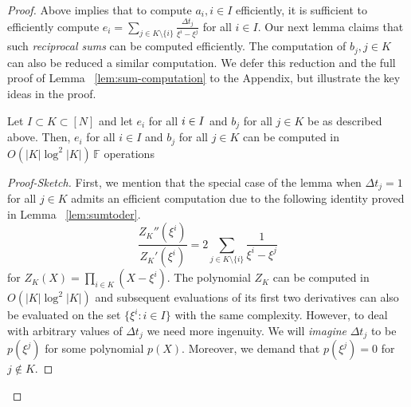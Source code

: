 \begin{proof}
    Above implies that to compute $a_i, i\in I$ efficiently, it is sufficient to efficiently
    compute $e_i=\sum_{j\in K\setminus\{i\}}\frac{\Delta t_j}{\xi^i-\xi^j}$ for all $i \in I$. Our next lemma claims that
    such {\em reciprocal sums} can be computed efficiently. The computation of $b_j,j\in K$ can also be reduced a similar computation.
    We defer this reduction and the full proof of Lemma ~\ref{lem:sum-computation} to the Appendix, but illustrate the key ideas in the proof.
    \begin{lemma}\label{lem:sum-computation}
    Let $I\subset K\subset [N]$ and let $e_i$ for all $i \in I$ and $b_j$ for all $j \in K$ be as described above.
    Then, $e_i$ for all $i \in I$ and $b_j$ for all $j \in K$ can be computed in $O(|K|\log^2|K|)\, \mathbb{F}$ operations
    \end{lemma}
    \begin{proof}[Proof-Sketch]
        First, we mention that the special case of the lemma when $\Delta t_j=1$ for all $j\in K$ admits an efficient computation due to the following identity
        proved in Lemma ~\ref{lem:sumtoder}.
        \begin{equation*}
            \frac{Z_K''(\xi^i)}{Z_K'(\xi^i)} = 2\sum_{j\in K\setminus \{i\}}\frac{1}{\xi^i-\xi^j}
        \end{equation*}
        for $Z_K(X)=\prod_{i\in K}(X-\xi^i)$. The polynomial $Z_K$ can be computed in $O(|K|\log^2|K|)$ and subsequent evaluations of its first two
        derivatives can also be evaluated on the set $\{\xi^i: i\in I\}$ with the same complexity. However, to deal with arbitrary values of $\Delta t_j$ we
        need more ingenuity. We will {\em imagine} $\Delta t_j$ to be $p(\xi^j)$ for some polynomial $p(X)$. Moreover, we demand that $p(\xi^j)=0$ for $j\not\in K$.

\end{proof}
\end{proof}
